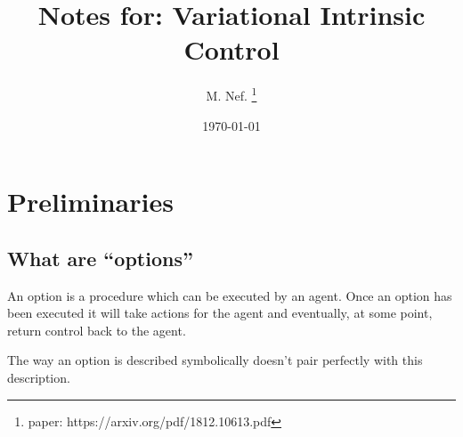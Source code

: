 \documentclass{article}
\title{Notes for: Variational Intrinsic Control}
\author{M. Nef. \thanks{paper: https://arxiv.org/pdf/1812.10613.pdf}}
\date{\today}
\begin{document}
\maketitle

\section{Preliminaries}

\subsection{What are ``options''}

An option is a procedure which can be executed by an agent. Once an option has been executed it will take actions for the agent and eventually, at some point, return control back to the agent.


The way an option is described symbolically doesn't pair perfectly with this description. 
\end{document}
